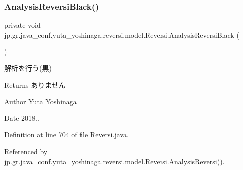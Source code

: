 \subsubsection{\texorpdfstring{Analysis\+Reversi\+Black()}{AnalysisReversiBlack()}}
{\footnotesize\ttfamily private void jp.\+gr.\+java\+\_\+conf.\+yuta\+\_\+yoshinaga.\+reversi.\+model.\+Reversi.\+Analysis\+Reversi\+Black (\begin{DoxyParamCaption}{ }\end{DoxyParamCaption})\hspace{0.3cm}{\ttfamily [private]}}



解析を行う(黒) 

\begin{DoxyReturn}{Returns}
ありません 
\end{DoxyReturn}
\begin{DoxyAuthor}{Author}
Yuta Yoshinaga 
\end{DoxyAuthor}
\begin{DoxyDate}{Date}
2018.. 
\end{DoxyDate}


Definition at line 704 of file Reversi.\+java.



Referenced by jp.\+gr.\+java\+\_\+conf.\+yuta\+\_\+yoshinaga.\+reversi.\+model.\+Reversi.\+Analysis\+Reversi().

